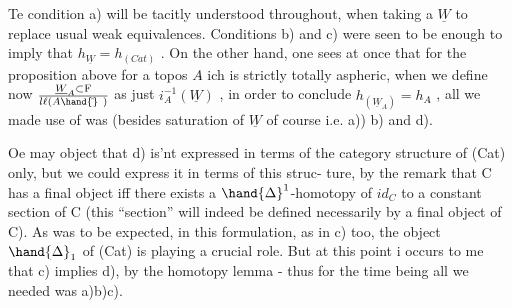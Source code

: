 
Te condition a) will be tacitly understood throughout, when taking
a $\underline{W}$ to replace usual weak equivalences. Conditions b) and c)  were seen to
be enough to imply that $h_{\underline{W}} = h_{(Cat)}$ . On the other hand, one sees at
once that for the proposition above for a  topos $A\hat{}$ ich
is strictly totally aspheric, when we define now $\underline{W}_A \subset \mathrm{F}\over{l}{\ell}(A\hand{\hat{}}\ )$ as just
$i_A^{-1}(\underline{W})$ , in order to conclude $h_{(\underline{W}_A)} = h_{A\hat{}}$ , all we made use of was
(besides saturation of $\underline{W}$ of course i.e. a)) b) and d).

Oe may object that d) is'nt expressed in terms of the category
structure of (Cat) only, but we could express it in terms of this struc-%
ture, by the remark that C has a final object iff there exists a
$\hand{\Delta}^1$-homotopy of $id_C$ to a constant section of C (this ``section'' will indeed
be defined necessarily by a final object of C). As was to be expected,
in this formulation, as in c) too, the object $\hand{\Delta}_1$ of (Cat) is playing a
crucial role. But at this point i occurs to me that c) implies d),
by the homotopy lemma - thus for the time being all we needed was
a)b)c).

